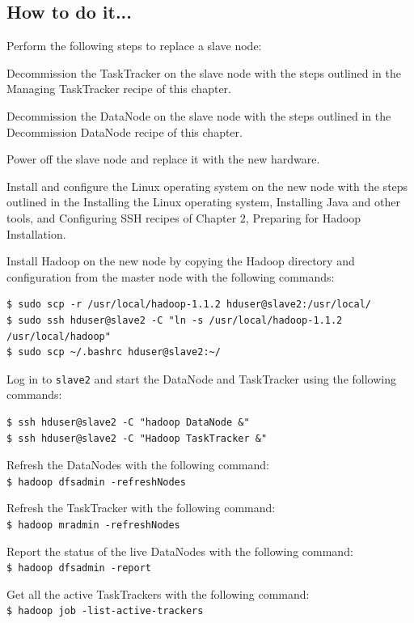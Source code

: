 \subsection*{How to do it...}
Perform the following steps to replace a slave node:

Decommission the TaskTracker on the slave node with the steps outlined in the Managing TaskTracker recipe of this chapter. 

Decommission the DataNode on the slave node with the steps outlined in the Decommission DataNode recipe of this chapter. 

Power off the slave node and replace it with the new hardware.

Install and configure the Linux operating system on the new node with the steps outlined in the Installing the Linux operating system, Installing Java and other tools, and Configuring SSH recipes of Chapter 2, Preparing for Hadoop Installation.

Install Hadoop on the new node by copying the Hadoop directory and configuration from the master node with the following commands:
\lstset{style=bashstyle}
\begin{lstlisting}
$ sudo scp -r /usr/local/hadoop-1.1.2 hduser@slave2:/usr/local/
$ sudo ssh hduser@slave2 -C "ln -s /usr/local/hadoop-1.1.2 /usr/local/hadoop"
$ sudo scp ~/.bashrc hduser@slave2:~/
\end{lstlisting}

Log in to \verb|slave2| and start the DataNode and TaskTracker using the following commands: 
\lstset{style=bashstyle}
\begin{lstlisting}
$ ssh hduser@slave2 -C "hadoop DataNode &"
$ ssh hduser@slave2 -C "Hadoop TaskTracker &" 
\end{lstlisting}

Refresh the DataNodes with the following command: \\
\verb|$ hadoop dfsadmin -refreshNodes|

Refresh the TaskTracker with the following command: \\
\verb|$ hadoop mradmin -refreshNodes|

Report the status of the live DataNodes with the following command: \\
\verb|$ hadoop dfsadmin -report|

Get all the active TaskTrackers with the following command: \\
\verb|$ hadoop job -list-active-trackers|
